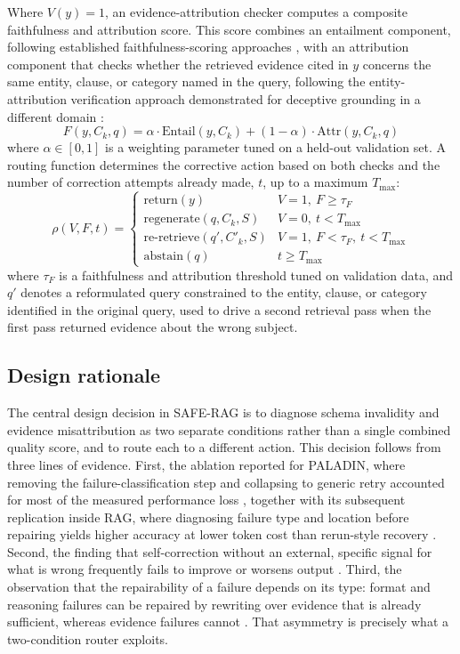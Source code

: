 \documentclass[10pt,twocolumn,letterpaper]{article}
\begin{document}
Where $V(y)=1$, an evidence-attribution checker computes a composite faithfulness and attribution score. This score combines an entailment component, following established faithfulness-scoring approaches \cite{ragas,alignscore}, with an attribution component that checks whether the retrieved evidence cited in $y$ concerns the same entity, clause, or category named in the query, following the entity-attribution verification approach demonstrated for deceptive grounding in a different domain \cite{deceptive}:
\begin{equation}
F(y, C_k, q) = \alpha \cdot \mathrm{Entail}(y, C_k) + (1-\alpha) \cdot \mathrm{Attr}(y, C_k, q)
\end{equation}
where $\alpha \in [0,1]$ is a weighting parameter tuned on a held-out validation set. A routing function determines the corrective action based on both checks and the number of correction attempts already made, $t$, up to a maximum $T_{\max}$:
\begin{equation}
\rho(V,F,t) = \begin{cases}
\mathrm{return}(y) & V=1,\ F \geq \tau_F \\[2pt]
\mathrm{regenerate}(q, C_k, S) & V=0,\ t < T_{\max} \\[2pt]
\mathrm{re\text{-}retrieve}(q', C'_k, S) & V=1,\ F < \tau_F,\ t < T_{\max} \\[2pt]
\mathrm{abstain}(q) & t \geq T_{\max}
\end{cases}
\end{equation}
where $\tau_F$ is a faithfulness and attribution threshold tuned on validation data, and $q'$ denotes a reformulated query constrained to the entity, clause, or category identified in the original query, used to drive a second retrieval pass when the first pass returned evidence about the wrong subject.

\subsection{Design rationale}

The central design decision in SAFE-RAG is to diagnose schema invalidity and evidence misattribution as two separate conditions rather than a single combined quality score, and to route each to a different action. This decision follows from three lines of evidence. First, the ablation reported for PALADIN, where removing the failure-classification step and collapsing to generic retry accounted for most of the measured performance loss \cite{paladin}, together with its subsequent replication inside RAG, where diagnosing failure type and location before repairing yields higher accuracy at lower token cost than rerun-style recovery \cite{doctorrag}. Second, the finding that self-correction without an external, specific signal for what is wrong frequently fails to improve or worsens output \cite{cannotselfcorrect}. Third, the observation that the repairability of a failure depends on its type: format and reasoning failures can be repaired by rewriting over evidence that is already sufficient, whereas evidence failures cannot \cite{doctorrag}. That asymmetry is precisely what a two-condition router exploits.
\end{document}
